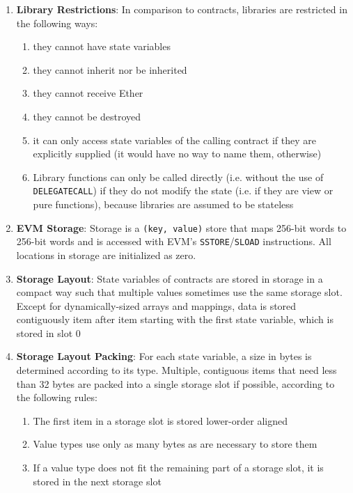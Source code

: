 \begin{enumerate}
\item\textbf{Library Restrictions}: In comparison to contracts, libraries are restricted in the following ways:
    \begin{enumerate}
	\item they cannot have state variables
	\item they cannot inherit nor be inherited
	\item they cannot receive Ether
	\item they cannot be destroyed
	\item it can only access state variables of the calling contract if they are explicitly supplied (it would have no way to name them, otherwise)
	\item Library functions can only be called directly (i.e. without the use of \verb|DELEGATECALL|) if they do not modify the state (i.e. if they are view or pure functions), because libraries are assumed to be stateless
    \end{enumerate}

\item\textbf{EVM Storage}: Storage is a \verb|(key, value)| store that maps 256-bit words to 256-bit words and is accessed with EVM’s \verb|SSTORE|/\verb|SLOAD| instructions. All locations in storage are initialized as zero.

\item\textbf{Storage Layout}: State variables of contracts are stored in storage in a compact way such that multiple values sometimes use the same storage slot. Except for dynamically-sized arrays and mappings, data is stored contiguously item after item starting with the first state variable, which is stored in slot 0

\item\textbf{Storage Layout Packing}: For each state variable, a size in bytes is determined according to its type. Multiple, contiguous items that need less than 32 bytes are packed into a single storage slot if possible, according to the following rules:
    \begin{enumerate}
	\item The first item in a storage slot is stored lower-order aligned
	\item Value types use only as many bytes as are necessary to store them
	\item If a value type does not fit the remaining part of a storage slot, it is stored in the next storage slot
    \end{enumerate}


\end{enumerate}
